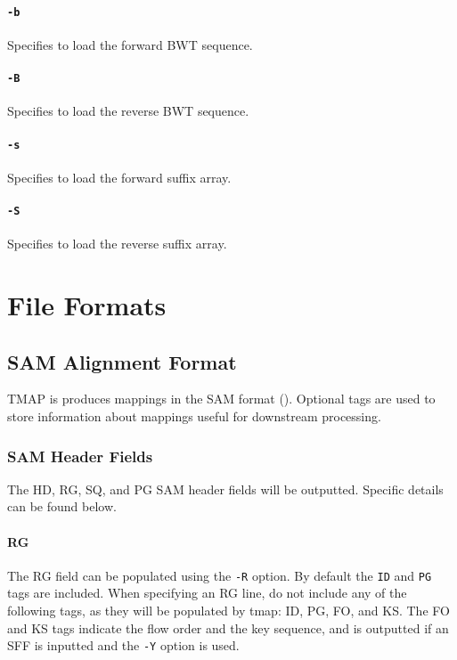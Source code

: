 \documentclass[a4paper,12pt]{book}
\newcommand{\TT}[1]{{\tt #1}} %
\begin{document}
\subsubsection{\TT{-b}}
Specifies to load the forward BWT sequence.

\subsubsection{\TT{-B}}
Specifies to load the reverse BWT sequence.

\subsubsection{\TT{-s}}
Specifies to load the forward suffix array.

\subsubsection{\TT{-S}}
Specifies to load the reverse suffix array.

\chapter{File Formats}

\section{SAM Alignment Format}
TMAP is produces mappings in the SAM format (\cite{SAM-format}).
Optional tags are used to store information about mappings useful for downstream processing.

\subsection{SAM Header Fields}

The HD, RG, SQ, and PG SAM header fields will be outputted.
Specific details can be found below.

\subsubsection{RG}
The RG field can be populated using the \TT{-R} option.
By default the \TT{ID} and \TT{PG} tags are included.
When specifying an RG line, do not include any of the following tags, as they will be populated by tmap:
ID, PG, FO, and KS.
The FO and KS tags indicate the flow order and the key sequence, and is outputted if an SFF is inputted and the \TT{-Y} option is used. 
\end{document}
